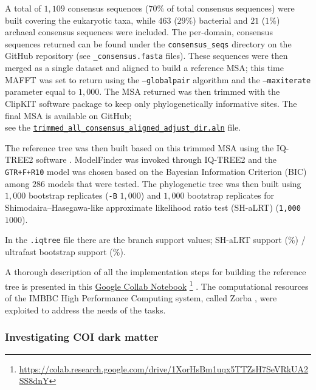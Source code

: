   A total of $1,109$ consensus sequences ($70\%$ of total consensus sequences) were built covering the eukaryotic taxa, 
   while $463$ ($29\%$) bacterial and $21$ ($1\%$) archaeal consensus sequences were included. 
   The per-domain, consensus sequences returned can be found under the \texttt{consensus\_seqs} directory on 
   the GitHub repository 
   (see \texttt{\_consensus.fasta} files). 
   These sequences were then merged as a single dataset and aligned to build a reference MSA; 
   this time MAFFT was set to return using the \texttt{--globalpair} algorithm and the \texttt{--maxiterate} parameter 
   equal to $1,000$. 
   The MSA returned was then trimmed with the ClipKIT software package \citep{steenwyk_clipkit_2020} to keep only phylogenetically informative sites. 
   The final MSA is available on GitHub; \\
   see the \href{https://github.com/hariszaf/coi_dark_matter/blob/6df8559f27165f5327e4e56e9c36f5fab291fe49/build_tree_of_life/consensus_seqs/trimmed_all_consensus_aligned_adjust_dir.aln}{\texttt{trimmed\_all\_consensus\_aligned\_adjust\_dir.aln}} file.

   The reference tree was then built based on this trimmed MSA using the IQ-TREE2 software \citep{hoang2018ufboot2, minh_iq-tree_2020}.
   ModelFinder was invoked through IQ-TREE2 and the \texttt{GTR+F+R10} model was chosen based on the 
   Bayesian Information Criterion (BIC) among $286$ models that were tested. 
   The phylogenetic tree was then built using $1,000$ bootstrap replicates (\texttt{-B} $1,000$) and 
   $1,000$ bootstrap replicates for Shimodaira–Hasegawa-like approximate likelihood ratio test (SH-aLRT) (\texttt{1,000} $1000$).
   
   In the \texttt{.iqtree} file there are the branch support values; SH-aLRT support (\%) / ultrafast bootstrap support (\%).
   
   A thorough description of all the implementation steps for building the reference tree is presented in this 
   \href{https://colab.research.google.com/drive/1XorHsBm1uqx5TTZsH7SeVRkUA2SS8dnY}{Google Collab Notebook} 
   \footnote{
      \href{https://colab.research.google.com/drive/1XorHsBm1uqx5TTZsH7SeVRkUA2SS8dnY}{https://colab.research.google.com/drive/1XorHsBm1uqx5TTZsH7SeVRkUA2SS8dnY}
   }
   . 
   The computational resources of the IMBBC High Performance Computing system, called Zorba \citep{zafeiropoulos_0s_2021}, were exploited to address the needs of the tasks.


   \subsubsection{Investigating COI dark matter}
   \label{subsec:darn-methods-investigate}

